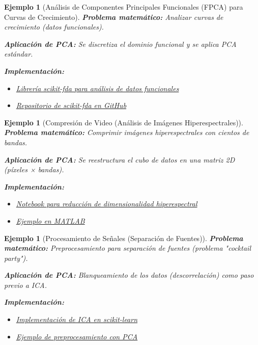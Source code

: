 \documentclass[11pt]{article}
\theoremstyle{plain}
\newtheorem{example}[theorem]{Ejemplo}
\begin{document}
\begin{example}[Análisis de Componentes Principales Funcionales (FPCA) para Curvas de Crecimiento]
\label{ej:fpca}
\textbf{Problema matemático:} Analizar curvas de crecimiento (datos funcionales).

\textbf{Aplicación de PCA:} Se discretiza el dominio funcional y se aplica PCA estándar.

\textbf{Implementación:}
\begin{itemize}
    \item \href{https://pypi.org/project/scikit-fda/}{Librería scikit-fda para análisis de datos funcionales}
    \item \href{https://github.com/GAA-UAM/scikit-fda}{Repositorio de scikit-fda en GitHub}
\end{itemize}
\end{example}

\begin{example}[Compresión de Video (Análisis de Imágenes Hiperespectrales)]
\label{ej:video}
\textbf{Problema matemático:} Comprimir imágenes hiperespectrales con cientos de bandas.

\textbf{Aplicación de PCA:} Se reestructura el cubo de datos en una matriz 2D (píxeles × bandas).

\textbf{Implementación:}
\begin{itemize}
    \item \href{https://github.com/GeospatialPython/pyspatial/blob/master/hyperspectral/notebooks/4_spectral_dimensionality_reduction.ipynb}{Notebook para reducción de dimensionalidad hiperespectral}
    \item \href{https://www.mathworks.com/help/images/dimensionality-reduction-using-pca-for-hyperspectral-images.html}{Ejemplo en MATLAB}
\end{itemize}
\end{example}

\begin{example}[Procesamiento de Señales (Separación de Fuentes)]
\label{ej:senales}
\textbf{Problema matemático:} Preprocesamiento para separación de fuentes (problema "cocktail party").

\textbf{Aplicación de PCA:} Blanqueamiento de los datos (descorrelación) como paso previo a ICA.

\textbf{Implementación:}
\begin{itemize}
    \item \href{https://scikit-learn.org/stable/modules/generated/sklearn.decomposition.FastICA.html}{Implementación de ICA en scikit-learn}
    \item \href{https://github.com/explosion/spaCy/blob/master/spacy/pipeline/trainable_pipe.pyx}{Ejemplo de preprocesamiento con PCA}
\end{itemize}
\end{example}
\end{document}
